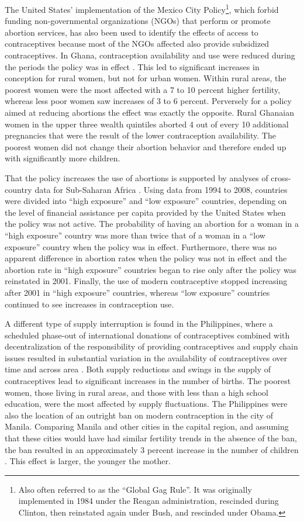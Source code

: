 \documentclass[letterpaper,12pt]{article}
\begin{document}
The United States' implementation of the Mexico City
Policy\footnote{Also often referred to as the ``Global Gag Rule''.
It was originally implemented in 1984 under the Reagan administration,
rescinded during Clinton, then reinstated again under Bush, and
rescinded under Obama.}, which forbid funding non-governmental
organizations (NGOs) that perform or promote abortion services, has also
been used to identify the effects of access to contraceptives because
most of the NGOs affected also provide subsidized contraceptives.
In Ghana, contraception availability and use were reduced during the
periods the policy was in effect \citep{Jones2015}.
This led to significant increases in conception for rural women, but not
for urban women.
Within rural areas, the poorest women were the most affected with a 7 to
10 percent higher fertility, whereas less poor women saw increases of 3
to 6 percent.
Perversely for a policy aimed at reducing abortions the effect was
exactly the opposite.
Rural Ghanaian women in the upper three wealth quintiles aborted 4 out
of every 10 additional pregnancies that were the result of the lower
contraception availability.
The poorest women did not change their abortion behavior and therefore
ended up with significantly more children.

That the policy increases the use of abortions is supported by analyses
of cross-country data for Sub-Saharan Africa \citep{Bendavid2011}.
Using data from 1994 to 2008, countries were divided into ``high
exposure'' and ``low exposure'' countries, depending on the level of
financial assistance per capita provided by the United States when the
policy was not active.
The probability of having an abortion for a woman in a ``high exposure''
country was more than twice that of a woman in a ``low exposure''
country when the policy was in effect.
Furthermore, there was no apparent difference in abortion rates when the
policy was not in effect and the abortion rate in ``high exposure''
countries began to rise only after the policy was reinstated in 2001.
Finally, the use of modern contraceptive stopped increasing after 2001
in ``high exposure'' countries, whereas ``low exposure'' countries
continued to see increases in contraception use.

A different type of supply interruption is found in the Philippines,
where a scheduled phase-out of international donations of contraceptives
combined with decentralization of the responsibility of providing
contraceptives and supply chain issues resulted in substantial variation in
the availability of contraceptives over time and across area
\citep{Salas2014}.
Both supply reductions and swings in the supply of contraceptives lead
to significant increases in the number of births.
The poorest women, those living in rural areas, and those with less than
a high school education, were the most affected by supply fluctuations.
The Philippines were also the location of an outright ban on modern
contraception in the city of Manila.
Comparing Manila and other cities in the capital region, and assuming
that these cities would have had similar fertility trends in the absence
of the ban, the ban resulted in an approximately 3 percent increase in
the number of children \citep{Dumas2017}.
This effect is larger, the younger the mother.
\end{document}
